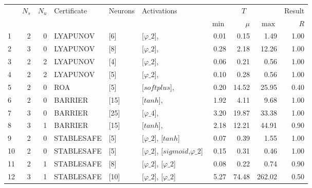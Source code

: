 \begin{tabular}{lrrlllrrrr}
    \toprule
       & $N_s$ & $N_u$ & Certificate & Neurons & Activations                                  & \multicolumn{3}{c}{$T$} & Result                 \\
       &       &       &             &         &                                              & $\min$                  & $\mu$  & $\max$ & $R$  \\
    \midrule
    1  & 2     & 0     & LYAPUNOV    & [6]     & [$\varphi\_{2}$],                            & 0.01                    & 0.15   & 1.49   & 1.00 \\
    2  & 3     & 0     & LYAPUNOV    & [8]     & [$\varphi\_{2}$],                            & 0.28                    & 2.18   & 12.26  & 1.00 \\
    3  & 2     & 2     & LYAPUNOV    & [4]     & [$\varphi\_{2}$],                            & 0.06                    & 0.21   & 0.56   & 1.00 \\
    4  & 2     & 2     & LYAPUNOV    & [5]     & [$\varphi\_{2}$],                            & 0.10                    & 0.28   & 0.56   & 1.00 \\
    5  & 2     & 0     & ROA         & [5]     & [$softplus$],                                & 0.20                    & 14.52  & 25.95  & 0.40 \\
    6  & 2     & 0     & BARRIER     & [15]    & [$tanh$],                                    & 1.92                    & 4.11   & 9.68   & 1.00 \\
    7  & 3     & 0     & BARRIER     & [25]    & [$\varphi\_{4}$],                            & 3.20                    & 19.87  & 33.38  & 1.00 \\
    8  & 3     & 1     & BARRIER     & [15]    & [$tanh$],                                    & 2.18                    & 12.21  & 44.91  & 0.90 \\
    9  & 2     & 0     & STABLESAFE  & [5]     & [$\varphi\_{2}$], [$tanh$]                   & 0.07                    & 0.39   & 1.55   & 1.00 \\
    10 & 2     & 0     & STABLESAFE  & [5]     & [$\varphi\_{2}$], [$sigmoid$,$\varphi\_{2}$] & 0.15                    & 0.31   & 0.46   & 1.00 \\
    11 & 2     & 1     & STABLESAFE  & [8]     & [$\varphi\_{2}$], [$\varphi\_{2}$]           & 0.08                    & 0.22   & 0.74   & 0.90 \\
    12 & 3     & 1     & STABLESAFE  & [10]    & [$\varphi\_{2}$], [$\varphi\_{2}$]           & 5.27                    & 74.48  & 262.02 & 0.50 \\

\end{tabular}
